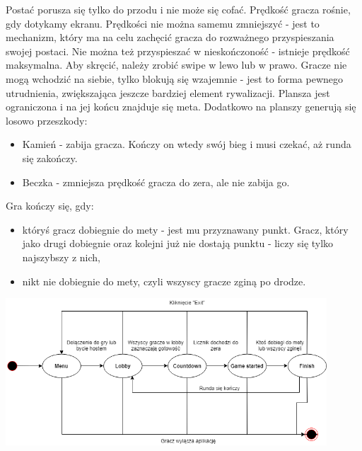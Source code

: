 \documentclass[]{report}
\begin{document}
Postać porusza się tylko do przodu i nie może się cofać. Prędkość gracza rośnie, gdy dotykamy ekranu. Prędkości nie można samemu zmniejszyć - jest to mechanizm, który ma na celu zachęcić gracza do rozważnego przyspieszania swojej postaci. Nie można też przyspieszać w nieskończoność - istnieje prędkość maksymalna. Aby skręcić, należy zrobić swipe w lewo lub w prawo. Gracze nie mogą wchodzić na siebie, tylko blokują się wzajemnie - jest to forma pewnego utrudnienia, zwiększająca jeszcze bardziej element rywalizacji. Plansza jest ograniczona i na jej końcu znajduje się meta. Dodatkowo na planszy generują się losowo przeszkody:
\begin{itemize}
	\item Kamień - zabija gracza. Kończy on wtedy swój bieg i musi czekać, aż runda się zakończy.
	\item Beczka - zmniejsza prędkość gracza do zera, ale nie zabija go.
\end{itemize}
Gra kończy się, gdy:
\begin{itemize}
	\item któryś gracz dobiegnie do mety - jest mu przyznawany punkt. Gracz, który jako drugi dobiegnie oraz kolejni już nie dostają punktu - liczy się tylko najszybszy z nich,
	\item nikt nie dobiegnie do mety, czyli wszyscy gracze zginą po drodze.
\end{itemize}
\begin{center}
	\includegraphics[width=0.9\textwidth]{game_cycle.png}
\end{center}
\end{document}

